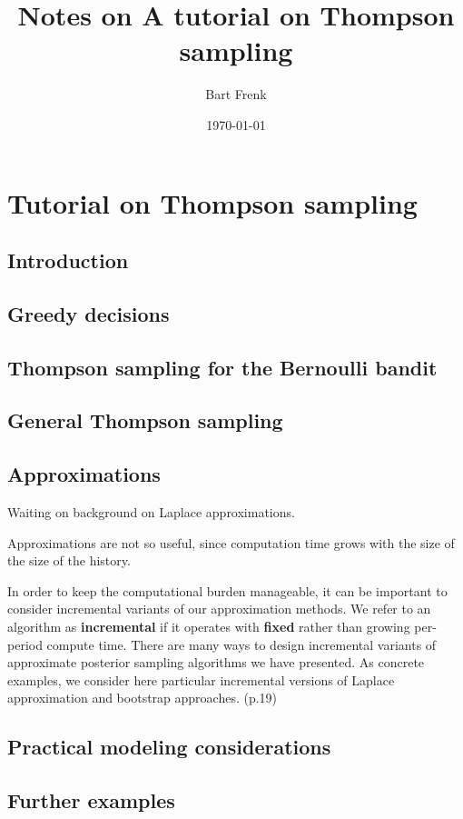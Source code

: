 \documentclass[11pt]{article}
\author{Bart Frenk}
\date{\today}
\title{Notes on A tutorial on Thompson sampling}
\begin{document}
\maketitle


\section{Tutorial on Thompson sampling}
\label{sec-1}
\subsection{Introduction}
\label{sec-1-1}
\subsection{Greedy decisions}
\label{sec-1-2}
\subsection{Thompson sampling for the Bernoulli bandit}
\label{sec-1-3}
\subsection{General Thompson sampling}
\label{sec-1-4}
\subsection{Approximations}
\label{sec-1-5}
Waiting on background on Laplace approximations.

Approximations are not so useful, since computation time grows with the size of
the size of the history.

In order to keep the computational burden manageable, it can be important to
consider incremental variants of our approximation methods. We refer to an
algorithm as \textbf{incremental} if it operates with \textbf{fixed} rather than growing
per-period compute time. There are many ways to design incremental variants of
approximate posterior sampling algorithms we have presented. As concrete
examples, we consider here particular incremental versions of Laplace
approximation and bootstrap approaches. (p.19)

\subsection{Practical modeling considerations}
\label{sec-1-6}
\subsection{Further examples}
\label{sec-1-7}
\end{document}
